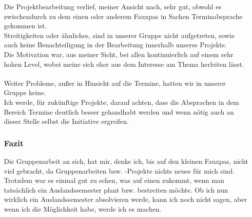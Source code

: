 \documentclass[11pt]{article}
\begin{document}
Die Projektbearbeitung verlief, meiner Ansicht nach, sehr gut, obwohl es zwischendurch zu dem einen oder anderem Fauxpas in Sachen Terminabsprache gekommen ist.\\
Streitigkeiten oder ähnliches, sind in unserer Gruppe nicht aufgetreten, sowie auch keine Benachteiligung in der Bearbeitung innerhalb unseres Projekts.\\
Die Motivation war, aus meiner Sicht, bei allen kontinuierlich auf einem sehr hohen Level, wobei meine sich eher aus dem Interesse am Thema herleiten lässt.
\\\\
Weiter Probleme, außer in Hinsicht auf die Termine, hatten wir in unserer Gruppe keine.\\
Ich werde, für zukünftige Projekte, darauf achten, dass die Absprachen in dem Bereich Termine deutlich besser gehandhabt werden und wenn nötig auch an dieser Stelle selbst die Initiative ergreifen.

\subsubsection{Fazit}

Die Gruppenarbeit an sich, hat mir, denke ich, bis auf den kleinen Fauxpas, nicht viel gebracht, da Gruppenarbeiten bzw. -Projekte nichts neues für mich sind.\\
Trotzdem war es einmal gut zu sehen, was auf einen zukommt, wenn man tatsächlich ein Auslandssemester plant bzw. bestreiten möchte.
Ob ich nun wirklich ein Auslandssemester absolvieren werde, kann ich noch nicht sagen, aber wenn ich die Möglichkeit habe, werde ich es machen.

\newpage
\end{document}

